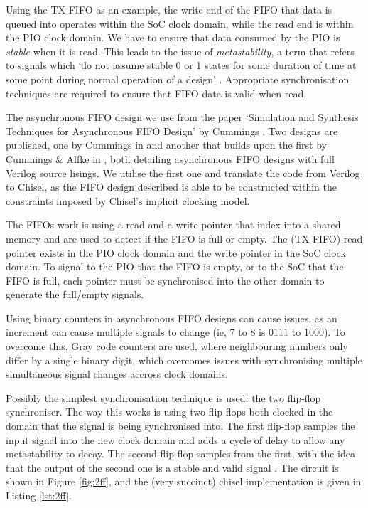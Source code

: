 Using the TX FIFO as an example, the write end of the FIFO that data is queued into operates within the SoC clock domain, while the read end is within the PIO clock domain. We have to ensure that data consumed by the PIO is \textit{stable} when it is read. This leads to the issue of \textit{metastability}, a term that refers to signals which `do not assume stable 0 or 1 states for some duration of time at
some point during normal operation of a design' \cite{cdc}. Appropriate synchronisation techniques are required to ensure that FIFO data is valid when read.

The asynchronous FIFO design we use from the paper `Simulation and Synthesis Techniques for Asynchronous FIFO Design' by Cummings \cite{fifo1}. Two designs are published, one by Cummings in \cite{fifo1} and another that builds upon the first by Cummings \& Alfke in \cite{fifo2}, both detailing asynchronous FIFO designs with full Verilog source lisings. We utilise the first one and translate the code from Verilog to Chisel, as the FIFO design described is able to be constructed within the constraints imposed by Chisel's implicit clocking model.

The FIFOs work is using a read and a write pointer that index into a shared memory and are used to detect if the FIFO is full or empty. The (TX FIFO) read pointer exists in the PIO clock domain and the write pointer in the SoC clock domain. To signal to the PIO that the FIFO is empty, or to the SoC that the FIFO is full, each pointer must be synchronised into the other domain to generate the full/empty signals.

Using binary counters in asynchronous FIFO designs can cause issues, as an increment can cause multiple signals to change (ie, 7 to 8 is 0111 to 1000). To overcome this, Gray code counters are used, where neighbouring numbers only differ by a single binary digit, which overcomes issues with synchronising multiple simultaneous signal changes accross clock domains.

Possibly the simplest synchronisation technique is used: the two flip-flop synchroniser. The way this works is using two flip flops both clocked in the domain that the signal is being synchronised into. The first flip-flop samples the input signal into the new clock domain and adds a cycle of delay to allow any metastability to decay. The second flip-flop samples from the first, with the idea that the output of the second one is a stable and valid signal \cite{cdc}. The circuit is shown in Figure \ref{fig:2ff}, and the (very succinct) chisel implementation is given in Listing \ref{lst:2ff}.

